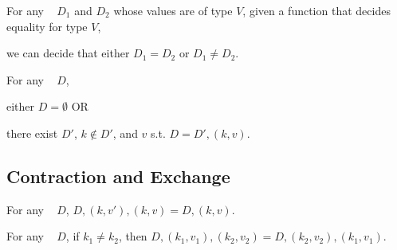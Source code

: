 \begin{theorem}[\EqDec]
\label{thm:EqDec}

\breakAndIndent
%
For any \dds~ $D_1$ and $D_2$ whose values are of type $V$,
%
given a function that decides equality for type $V$,
%

\justIndent
%
we can decide that either $D_1 = D_2$ or $D_1 \ne D_2$.

\end{theorem}

\begin{theorem}
\label{thm:EzDstr}

\breakAndIndent
%
For any \dd~ $D$,

\justIndent \quad
%
either $D = \emptyset$ OR

\justIndent \quad
%
there exist $D'$, $k \notin D'$, and $v$
%
s.t. $D = D' , (k, v)$.

\end{theorem}

\subsection{Contraction and Exchange}


\begin{theorem}
\label{thm:cont-dicts}

\breakAndIndent
%
For any {\dd}~ $D$,
%
$D, (k, v'), (k, v) = D, (k, v)$.

\end{theorem}

\begin{theorem}
\label{thm:exch-dicts}

\breakAndIndent
%
For any {\dd}~ $D$,
%
if $k_1 \ne k_2$, then
%
$D, (k_1, v_1), (k_2, v_2) = D, (k_2, v_2), (k_1, v_1)$.

\end{theorem}
